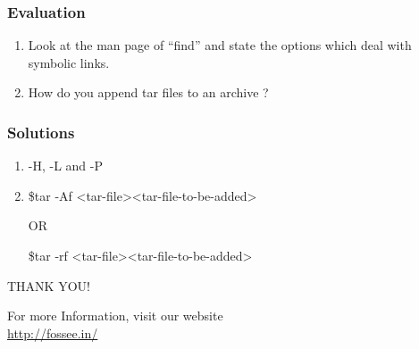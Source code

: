 \documentclass[17pt,compress]{beamer}
\begin{document}
\begin{frame}[fragile]
\frametitle{Evaluation}
\label{sec-9}


\begin{enumerate}
\item Look at the man page of ``find'' and state the options which
    deal with symbolic links.
\vspace{8pt}
\item How do you append tar files to an archive ?
\end{enumerate}
\end{frame}
\begin{frame}
\frametitle{Solutions}

\begin{enumerate}
\item  -H,  -L  and  -P   
\vspace{15pt}
\item \$tar -Af <tar-file><tar-file-to-be-added>
\begin{center}
OR \\
\end{center}
\$tar -rf <tar-file><tar-file-to-be-added>
\end{enumerate}

\end{frame}
\begin{frame}

  \begin{block}{}
  \begin{center}
  {\Large THANK YOU!} 
  \end{center}
  \end{block}
\begin{block}{}
  \begin{center}
    For more Information, visit our website\\
    {\color{blue}\url{http://fossee.in/}}
  \end{center}  
  \end{block}
\end{frame}
\end{document}
